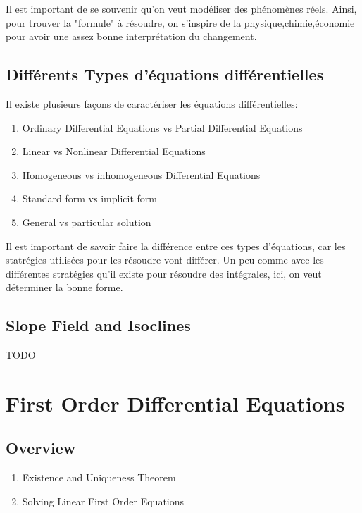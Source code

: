 \documentclass{article}
\begin{document}
Il est important de se souvenir qu'on veut modéliser des phénomènes
réels. Ainsi, pour trouver la "formule" à résoudre, on s'inspire de
la physique,chimie,économie pour avoir une assez bonne interprétation
du changement.

\subsection{Différents Types d'équations différentielles}%
\label{sub:Différents Types d'équations différentielles}

Il existe plusieurs façons de caractériser les équations différentielles:
\begin{enumerate}
    \item Ordinary Differential Equations vs Partial Differential Equations
    \item Linear vs Nonlinear Differential Equations
    \item Homogeneous vs inhomogeneous Differential Equations
    \item Standard form vs implicit form
    \item General vs particular solution
\end{enumerate}

Il est important de savoir faire la différence entre ces types d'équations,
car les statrégies utilisées pour les résoudre vont différer. Un peu comme
avec les différentes stratégies qu'il existe pour résoudre des intégrales, ici,
on veut déterminer la bonne forme.

\subsection{Slope Field and Isoclines}%
\label{sub:}

TODO

\section{First Order Differential Equations}

\subsection{Overview}%
\label{sub:Overview}

\begin{enumerate}
    \item Existence and Uniqueness Theorem
    \item Solving Linear First Order Equations
\end{enumerate}
\end{document}
